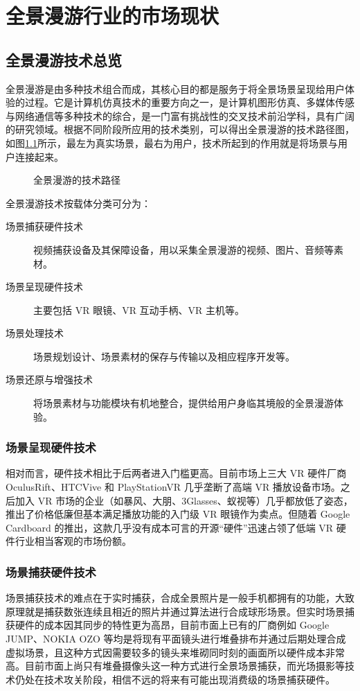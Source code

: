 \chapter{全景漫游行业的市场现状}

\section{全景漫游技术总览}

全景漫游是由多种技术组合而成，其核心目的都是服务于将全景场景呈现给用户体验的过程。它是计算机仿真技术的重要方向之一，是计算机图形仿真、多媒体传感与网络通信等多种技术的综合，是一门富有挑战性的交叉技术前沿学科，具有广阔的研究领域。根据不同阶段所应用的技术类别，可以得出全景漫游的技术路径图，如图\ref{fig:process}所示，最左为真实场景，最右为用户，技术所起到的作用就是将场景与用户连接起来。

\begin{figure}[htp]
\centering
{}
\caption{全景漫游的技术路径}
\label{fig:process}
\end{figure}

全景漫游技术按载体分类可分为：
\begin{description}
\item[场景捕获硬件技术]视频捕获设备及其保障设备，用以采集全景漫游的视频、图片、音频等素材。
\item[场景呈现硬件技术] 主要包括 VR 眼镜、VR 互动手柄、VR 主机等。
\item[场景处理技术] 场景规划设计、场景素材的保存与传输以及相应程序开发等。
\item[场景还原与增强技术] 将场景素材与功能模块有机地整合，提供给用户身临其境般的全景漫游体验。
\end{description}

\subsection{场景呈现硬件技术}
相对而言，硬件技术相比于后两者进入门槛更高。目前市场上三大 VR 硬件厂商 OculusRift、HTCVive 和 PlayStationVR 几乎垄断了高端 VR 播放设备市场。之后加入 VR 市场的企业（如暴风、大朋、3Glasses、蚁视等）几乎都放低了姿态，推出了价格低廉但基本满足播放功能的入门级 VR 眼镜作为卖点。但随着 Google Cardboard 的推出，这款几乎没有成本可言的开源“硬件”迅速占领了低端 VR 硬件行业相当客观的市场份额。

\subsection{场景捕获硬件技术}
场景捕获技术的难点在于实时捕获，合成全景照片是一般手机都拥有的功能，大致原理就是捕获数张连续且相近的照片并通过算法进行合成球形场景。但实时场景捕获硬件的成本因其同步的特性更为高昂，目前市面上已有的厂商例如 Google JUMP、NOKIA OZO 等均是将现有平面镜头进行堆叠排布并通过后期处理合成虚拟场景，且这种方式因需要较多的镜头来堆砌同时刻的画面所以硬件成本非常高。目前市面上尚只有堆叠摄像头这一种方式进行全景场景捕获，而光场摄影等技术仍处在技术攻关阶段，相信不远的将来有可能出现消费级的场景捕获硬件。

